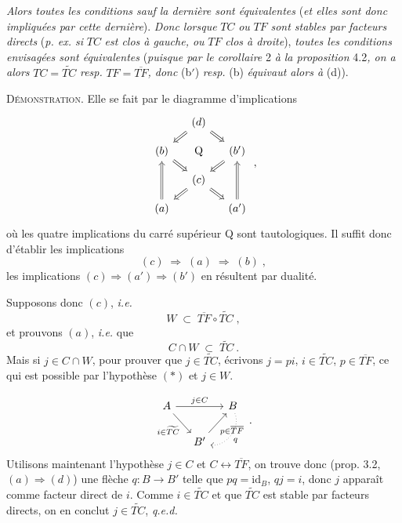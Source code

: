 \documentclass[11pt]{article}
\newcommand{\printedpage}[1]{\marginpar{\footnotesize p.~#1}}
\newcommand{\msp}[1]{\marginpar{\footnotesize [#1]}}
\newcommand{\id}{\mathrm{id}}
\begin{document}
\msp{page 33}
\textit{Alors toutes les conditions sauf la dernière sont équivalentes} (\textit{et elles sont donc impliquées par cette dernière}). \textit{Donc lorsque} $TC$ \textit{ou} $TF$ \textit{sont stables par facteurs directs} (\textit{p. ex. si} $TC$ \textit{est clos à gauche, ou} $TF$ \textit{clos à droite}), \textit{toutes les conditions envisagées sont équivalentes} (\textit{puisque par le corollaire} 2 \textit{à la proposition} 4.2\textit{, on a alors} $TC=\widetilde{TC}$ \textit{resp.} $TF=\overline{TF}$\textit{, donc} (b$'$) \textit{resp.} (b) \textit{équivaut alors à} (d)).

\textsc{Démonstration}. Elle se fait par le diagramme d'implications
\[
\begin{tikzcd}[column sep=small, row sep=small]
& (d) \arrow[dl, Rightarrow] \arrow[dr, Rightarrow] & \\
(b) \arrow[dr, Rightarrow] & \mathrm{Q} & (b') \arrow[dl, Rightarrow] \\
& (c) \arrow[dl, Rightarrow] \arrow[dr, Rightarrow] & \\
(a) \arrow[uu, Rightarrow] & & (a') \arrow[uu, Rightarrow]
\end{tikzcd}
\;,
\]
\printedpage{23}
où les quatre implications du carré supérieur Q sont tautologiques. Il suffit donc d'établir les implications
\[
(c) \;\Longrightarrow\; (a) \;\Longrightarrow\; (b)\;,
\]
les implications $(c)\Longrightarrow(a')\Longrightarrow(b')$ en résultent par dualité.

Supposons donc $(c)$, \textit{i.e.}
\[
W \;\subset\; \overline{TF}\circ\widetilde{TC}\;,
\tag*{$(*)$}
\]
et prouvons $(a)$, \textit{i.e.} que
\[
C\cap W \;\subset\; \widetilde{TC}\ .
\]
Mais si $j\in C\cap W$, pour prouver que $j\in\widetilde{TC}$, écrivons $j=pi$, $i\in\widetilde{TC}$, $p\in\overline{TF}$, ce qui est possible par l'hypothèse $(*)$ et $j\in W$.

\msp{page 34}
\[
\begin{tikzcd}[column sep=small]
A \arrow[rr, "j\in C"] \arrow[dr, "i\in\widetilde{TC}"'] & & B \arrow[dl, dotted, bend left=60, "q"] \\
& B' \arrow[ur, "p\in\overline{TF}"'] &
\end{tikzcd}
\;.
\]
Utilisons maintenant l'hypothèse $j\in C$ et $C\longleftrightarrow\overline{TF}$, on trouve donc (prop. 3.2, $(a)\Longrightarrow(d)$) une flèche $q:B\longrightarrow B'$ telle que $pq=\id_B$, $qj=i$, donc $j$ apparaît comme facteur direct de $i$. Comme $i\in\widetilde{TC}$ et que $\widetilde{TC}$ est stable par facteurs directs, on en conclut $j\in\widetilde{TC}$, \quad \textit{q.e.d.}
\end{document}
